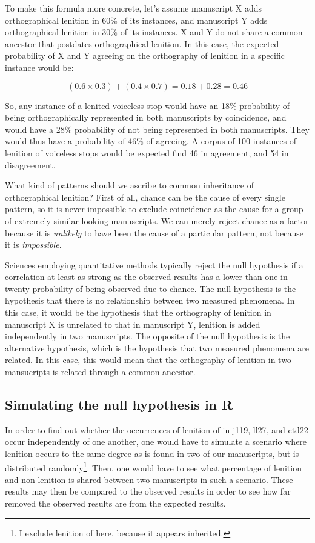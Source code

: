 To make this formula more concrete, let's assume manuscript X adds orthographical lenition in 60\% of its instances, and manuscript Y adds orthographical lenition in 30\% of its instances. X and Y do not share a common ancestor that postdates orthographical lenition. In this case, the expected probability of X and Y agreeing on the orthography of lenition in a specific instance would be:

\[(0.6 \times 0.3) + (0.4 \times 0.7) = 0.18 + 0.28 = 0.46\]

So, any instance of a lenited voiceless stop would have an 18\% probability of being orthographically represented in both manuscripts by coincidence, and would have a 28\% probability of not being represented in both manuscripts. They would thus have a probability of 46\% of agreeing. A corpus of 100 instances of lenition of voiceless stops would be expected find 46 in agreement, and 54 in disagreement.

What kind of patterns should we ascribe to common inheritance of orthographical lenition? First of all, chance can be the cause of every single pattern, so it is never impossible to exclude coincidence as the cause for a group of extremely similar looking manuscripts. We can merely reject chance as a factor because it is \emph{unlikely} to have been the cause of a particular pattern, not because it is \emph{impossible}.

Sciences employing quantitative methods typically reject the null hypothesis if a correlation at least as strong as the observed results has a lower than one in twenty probability of being observed due to chance.  The null hypothesis is the hypothesis that there is no relationship between two measured phenomena. In this case, it would be the hypothesis that the orthography of lenition in manuscript X is unrelated to that in manuscript Y, \ie lenition is added independently in two manuscripts. The opposite of the null hypothesis is the alternative hypothesis, which is the hypothesis that two measured phenomena are related. In this case, this would mean that the orthography of lenition in two mansucripts is related through a common ancestor.

\subsection{Simulating the null hypothesis in R}
\label{sec:simul-null-hypoth}

In order to find out whether the occurrences of lenition of  in \gls{j119}, \gls{ll27}, and \gls{ctd22} occur independently of one another, one would have to simulate a scenario where lenition occurs to the same degree as is found in two of our manuscripts, but is distributed randomly\footnote{I exclude lenition of  here, because it appears inherited.}. Then, one would have to see what percentage of lenition and non-lenition is shared between two manuscripts in such a scenario. These results may then be compared to the observed results in order to see how far removed the observed results are from the expected results.

